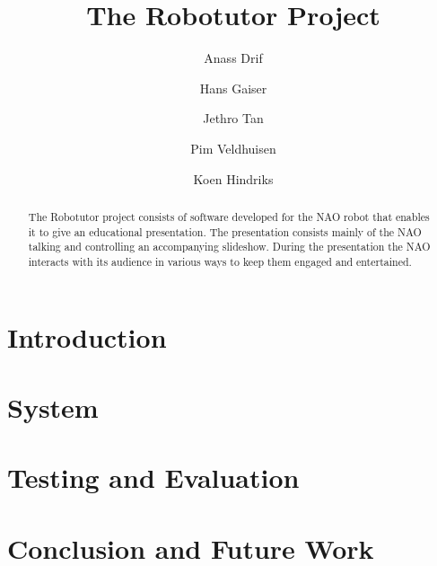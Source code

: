 \documentclass{llncs}
\title{The Robotutor Project}
\author{Anass Drif \and Hans Gaiser \and Jethro Tan \and Pim Veldhuisen \and Koen Hindriks}
\institute{TU Delft}
\begin{document}
\maketitle

\begin{abstract}
The Robotutor project consists of software developed for the NAO robot that enables it to give an educational presentation. The presentation consists mainly of the NAO talking and controlling an accompanying slideshow. During the presentation the NAO interacts with its audience in various ways to keep them engaged and entertained.
\end{abstract}

\section{Introduction} 

\section{System}

\section{Testing and Evaluation}

\section{Conclusion and Future Work}

\end{document}
